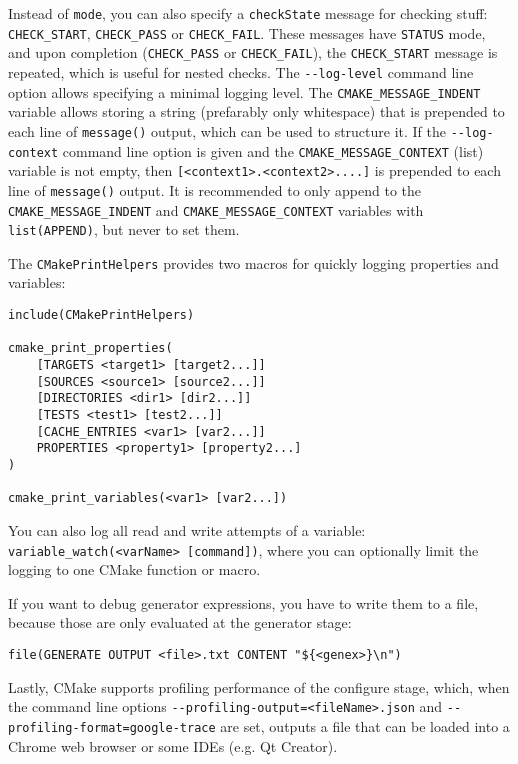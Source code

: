 \documentclass[8pt, table, xcdraw]{article}%
\begin{document}
Instead of \lstinline{mode}, you can also specify a \lstinline{checkState} message for checking stuff: \lstinline{CHECK_START}, \lstinline{CHECK_PASS} or \lstinline{CHECK_FAIL}. These messages have \lstinline{STATUS} mode, and upon completion (\lstinline{CHECK_PASS} or \lstinline{CHECK_FAIL}), the \lstinline{CHECK_START} message is repeated, which is useful for nested checks.
The \lstinline{--log-level} command line option allows specifying a minimal logging level. The \lstinline{CMAKE_MESSAGE_INDENT} variable allows storing a string (prefarably only whitespace) that is prepended to each line of \lstinline{message()} output, which can be used to structure it. If the \lstinline{--log-context} command line option is given and the \lstinline{CMAKE_MESSAGE_CONTEXT} (list) variable is not empty, then \lstinline{[<context1>.<context2>....]} is prepended to each line of \lstinline{message()} output. It is recommended to only append to the \lstinline{CMAKE_MESSAGE_INDENT} and \lstinline{CMAKE_MESSAGE_CONTEXT} variables with \lstinline{list(APPEND)}, but never to set them.

The \lstinline{CMakePrintHelpers} provides two macros for quickly logging properties and variables:

\begin{lstlisting}
include(CMakePrintHelpers)

cmake_print_properties(
    [TARGETS <target1> [target2...]]
    [SOURCES <source1> [source2...]]
    [DIRECTORIES <dir1> [dir2...]]
    [TESTS <test1> [test2...]]
    [CACHE_ENTRIES <var1> [var2...]]
    PROPERTIES <property1> [property2...]
)

cmake_print_variables(<var1> [var2...])
\end{lstlisting}

You can also log all read and write attempts of a variable: \lstinline{variable_watch(<varName> [command])}, where you can optionally limit the logging to one CMake function or macro.

If you want to debug generator expressions, you have to write them to a file, because those are only evaluated at the generator stage:

\begin{lstlisting}
file(GENERATE OUTPUT <file>.txt CONTENT "${<genex>}\n")
\end{lstlisting}

Lastly, CMake supports profiling performance of the configure stage, which, when the command line options \lstinline{--profiling-output=<fileName>.json} and \lstinline{--profiling-format=google-trace} are set, outputs a file that can be loaded into a Chrome web browser or some IDEs (e.g. Qt Creator).
\end{document}

